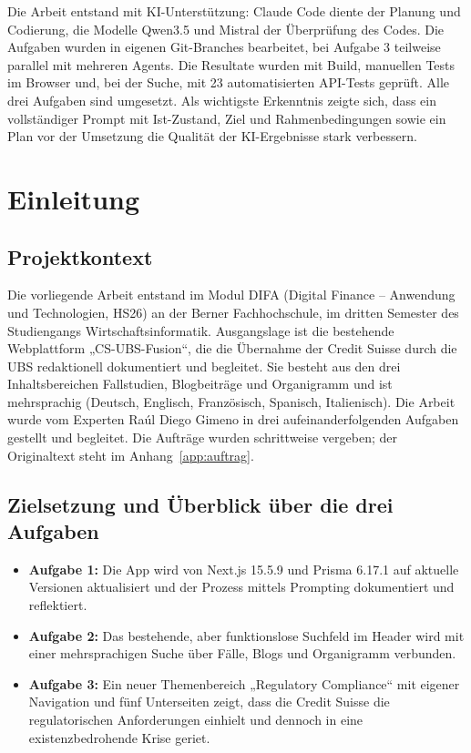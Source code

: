 \documentclass[11pt,a4paper]{article}
\let\oldsubsection\subsection
\renewcommand{\subsection}{\needspace{6\baselineskip}\oldsubsection}
\begin{document}
Die Arbeit entstand mit KI-Unterstützung: Claude Code diente der Planung und Codierung, die Modelle Qwen3.5 und Mistral der Überprüfung des Codes. Die Aufgaben wurden in eigenen Git-Branches bearbeitet, bei Aufgabe 3 teilweise parallel mit mehreren Agents. Die Resultate wurden mit Build, manuellen Tests im Browser und, bei der Suche, mit 23 automatisierten API-Tests geprüft. Alle drei Aufgaben sind umgesetzt. Als wichtigste Erkenntnis zeigte sich, dass ein vollständiger Prompt mit Ist-Zustand, Ziel und Rahmenbedingungen sowie ein Plan vor der Umsetzung die Qualität der KI-Ergebnisse stark verbessern.

\clearpage
\tableofcontents
\clearpage
{}

\section{Einleitung}

\subsection{Projektkontext}
Die vorliegende Arbeit entstand im Modul DIFA (Digital Finance – Anwendung und Technologien, HS26) an der Berner Fachhochschule, im dritten Semester des Studiengangs Wirtschaftsinformatik. Ausgangslage ist die bestehende Webplattform „CS-UBS-Fusion“, die die Übernahme der Credit Suisse durch die UBS redaktionell dokumentiert und begleitet. Sie besteht aus den drei Inhaltsbereichen Fallstudien, Blogbeiträge und Organigramm und ist mehrsprachig (Deutsch, Englisch, Französisch, Spanisch, Italienisch). Die Arbeit wurde vom Experten Raúl Diego Gimeno in drei aufeinanderfolgenden Aufgaben gestellt und begleitet. Die Aufträge wurden schrittweise vergeben; der Originaltext steht im Anhang~\ref{app:auftrag}.

\subsection{Zielsetzung und Überblick über die drei Aufgaben}
\begin{itemize}
  \item \textbf{Aufgabe 1:} Die App wird von Next.js 15.5.9 und Prisma 6.17.1 auf aktuelle Versionen aktualisiert und der Prozess mittels Prompting dokumentiert und reflektiert.
  \item \textbf{Aufgabe 2:} Das bestehende, aber funktionslose Suchfeld im Header wird mit einer mehrsprachigen Suche über Fälle, Blogs und Organigramm verbunden.
  \item \textbf{Aufgabe 3:} Ein neuer Themenbereich „Regulatory Compliance“ mit eigener Navigation und fünf Unterseiten zeigt, dass die Credit Suisse die regulatorischen Anforderungen einhielt und dennoch in eine existenzbedrohende Krise geriet.
\end{itemize}
\end{document}
